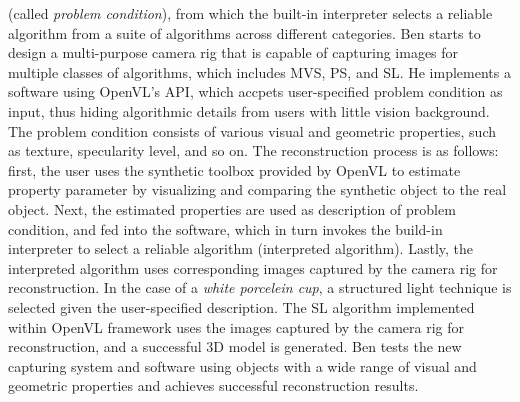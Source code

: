 (called \textit{problem condition}), from which the built-in interpreter selects a reliable algorithm from a suite of algorithms across different categories. Ben starts to design a multi-purpose camera rig that is capable of capturing images for multiple classes of algorithms, which includes MVS, PS, and SL. He implements a software using OpenVL's API, which accpets user-specified problem condition as input, thus hiding algorithmic details from users with little vision background. The problem condition consists of various visual and geometric properties, such as texture, specularity level, and so on. The reconstruction process is as follows: first, the user uses the synthetic toolbox provided by OpenVL to estimate property parameter by visualizing and comparing the synthetic object to the real object. Next, the estimated properties are used as description of problem condition, and fed into the software, which in turn invokes the build-in interpreter to select a reliable algorithm (interpreted algorithm). Lastly, the interpreted algorithm uses corresponding images captured by the camera rig for reconstruction. In the case of a \textit{white porcelein cup}, a structured light technique is selected given the user-specified description. The SL algorithm implemented within OpenVL framework uses the images captured by the camera rig for reconstruction, and a successful 3D model is generated. Ben tests the new capturing system and software using objects with a wide range of visual and geometric properties and achieves successful reconstruction results.




